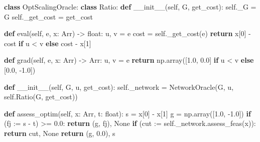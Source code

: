 \documentclass[
]{article}
\newenvironment{Shaded}{}{}
\newcommand{\BuiltInTok}[1]{\textcolor[rgb]{0.00,0.50,0.00}{#1}}
\newcommand{\ControlFlowTok}[1]{\textcolor[rgb]{0.00,0.44,0.13}{\textbf{#1}}}
\newcommand{\DecValTok}[1]{\textcolor[rgb]{0.25,0.63,0.44}{#1}}
\newcommand{\FloatTok}[1]{\textcolor[rgb]{0.25,0.63,0.44}{#1}}
\newcommand{\FunctionTok}[1]{\textcolor[rgb]{0.02,0.16,0.49}{#1}}
\newcommand{\KeywordTok}[1]{\textcolor[rgb]{0.00,0.44,0.13}{\textbf{#1}}}
\newcommand{\NormalTok}[1]{#1}
\newcommand{\OperatorTok}[1]{\textcolor[rgb]{0.40,0.40,0.40}{#1}}
\newcommand{\VariableTok}[1]{\textcolor[rgb]{0.10,0.09,0.49}{#1}}
\begin{document}
\begin{Shaded}
\begin{Highlighting}[]
\KeywordTok{class}\NormalTok{ OptScalingOracle:}
    \KeywordTok{class}\NormalTok{ Ratio:}
        \KeywordTok{def} \FunctionTok{\_\_init\_\_}\NormalTok{(}\VariableTok{self}\NormalTok{, G, get\_cost):}
            \VariableTok{self}\NormalTok{.\_G }\OperatorTok{=}\NormalTok{ G}
            \VariableTok{self}\NormalTok{.\_get\_cost }\OperatorTok{=}\NormalTok{ get\_cost}

        \KeywordTok{def} \BuiltInTok{eval}\NormalTok{(}\VariableTok{self}\NormalTok{, e, x: Arr) }\OperatorTok{{-}\textgreater{}} \BuiltInTok{float}\NormalTok{:}
\NormalTok{            u, v }\OperatorTok{=}\NormalTok{ e}
\NormalTok{            cost }\OperatorTok{=} \VariableTok{self}\NormalTok{.\_get\_cost(e)}
            \ControlFlowTok{return}\NormalTok{ x[}\DecValTok{0}\NormalTok{] }\OperatorTok{{-}}\NormalTok{ cost }\ControlFlowTok{if}\NormalTok{ u }\OperatorTok{\textless{}}\NormalTok{ v }\ControlFlowTok{else}\NormalTok{ cost }\OperatorTok{{-}}\NormalTok{ x[}\DecValTok{1}\NormalTok{]}

        \KeywordTok{def}\NormalTok{ grad(}\VariableTok{self}\NormalTok{, e, x: Arr) }\OperatorTok{{-}\textgreater{}}\NormalTok{ Arr:}
\NormalTok{            u, v }\OperatorTok{=}\NormalTok{ e}
            \ControlFlowTok{return}\NormalTok{ np.array([}\FloatTok{1.0}\NormalTok{, }\FloatTok{0.0}\NormalTok{] }\ControlFlowTok{if}\NormalTok{ u }\OperatorTok{\textless{}}\NormalTok{ v }\ControlFlowTok{else}\NormalTok{ [}\FloatTok{0.0}\NormalTok{, }\OperatorTok{{-}}\FloatTok{1.0}\NormalTok{])}

    \KeywordTok{def} \FunctionTok{\_\_init\_\_}\NormalTok{(}\VariableTok{self}\NormalTok{, G, u, get\_cost):}
        \VariableTok{self}\NormalTok{.\_network }\OperatorTok{=}\NormalTok{ NetworkOracle(G, u, }\VariableTok{self}\NormalTok{.Ratio(G, get\_cost))}

    \KeywordTok{def}\NormalTok{ assess\_optim(}\VariableTok{self}\NormalTok{, x: Arr, t: }\BuiltInTok{float}\NormalTok{):}
\NormalTok{        s }\OperatorTok{=}\NormalTok{ x[}\DecValTok{0}\NormalTok{] }\OperatorTok{{-}}\NormalTok{ x[}\DecValTok{1}\NormalTok{]}
\NormalTok{        g }\OperatorTok{=}\NormalTok{ np.array([}\FloatTok{1.0}\NormalTok{, }\OperatorTok{{-}}\FloatTok{1.0}\NormalTok{])}
        \ControlFlowTok{if}\NormalTok{ (fj }\OperatorTok{:=}\NormalTok{ s }\OperatorTok{{-}}\NormalTok{ t) }\OperatorTok{\textgreater{}=} \FloatTok{0.0}\NormalTok{:}
            \ControlFlowTok{return}\NormalTok{ (g, fj), }\VariableTok{None}
        \ControlFlowTok{if}\NormalTok{ (cut }\OperatorTok{:=} \VariableTok{self}\NormalTok{.\_network.assess\_feas(x)):}
            \ControlFlowTok{return}\NormalTok{ cut, }\VariableTok{None}
        \ControlFlowTok{return}\NormalTok{ (g, }\FloatTok{0.0}\NormalTok{), s}
\end{Highlighting}
\end{Shaded}
\end{document}
